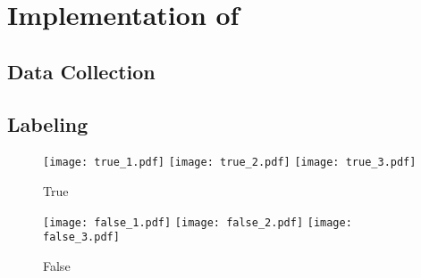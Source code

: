 \chapter{Implementation of \project}\label{ch:implementation}\glsresetall



\section{Data Collection}

\section{Labeling}
\begin{figure}
    \centering
    \texttt{[image: true\_1.pdf]}
    \texttt{[image: true\_2.pdf]}
    \texttt{[image: true\_3.pdf]}
    \caption{True}
    \label{fig:label_true}
\end{figure}

\begin{figure}
    \centering
    \texttt{[image: false\_1.pdf]}
    \texttt{[image: false\_2.pdf]}
    \texttt{[image: false\_3.pdf]}
    \caption{False}
    \label{fig:label_false}
\end{figure}
